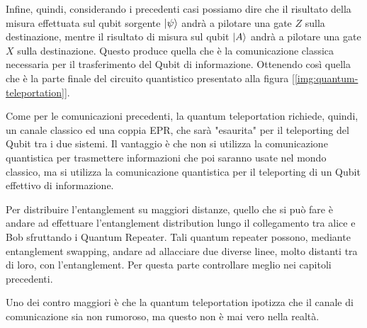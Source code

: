 Infine, quindi, considerando i precedenti casi possiamo dire che il risultato della misura effettuata sul qubit sorgente \(\ket{\psi}\) andrà a pilotare una gate \(Z\) sulla destinazione, mentre il risultato di misura sul qubit \(\ket{A}\) andrà a pilotare una gate \(X\) sulla destinazione. Questo produce quella che è la comunicazione classica necessaria per il trasferimento del Qubit di informazione. Ottenendo così quella che è la parte finale del circuito quantistico presentato alla figura [\ref{img:quantum-teleportation}].

Come per le comunicazioni precedenti, la quantum teleportation richiede, quindi, un canale classico ed una coppia EPR, che sarà "esaurita" per il teleporting del Qubit tra i due sistemi. Il vantaggio è che non si utilizza la comunicazione quantistica per trasmettere informazioni che poi saranno usate nel mondo classico, ma si utilizza la comunicazione quantistica per il teleporting di un Qubit effettivo di informazione. 

Per distribuire l'entanglement su maggiori distanze, quello che si può fare è andare ad effettuare l'entanglement distribution lungo il collegamento tra alice e Bob sfruttando i Quantum Repeater. Tali quantum repeater possono, mediante entanglement swapping, andare ad allacciare due diverse linee, molto distanti tra di loro, con l'entanglement. Per questa parte controllare meglio nei capitoli precedenti. 

Uno dei contro maggiori è che la quantum teleportation ipotizza che il canale di comunicazione sia non rumoroso, ma questo non è mai vero nella realtà. 